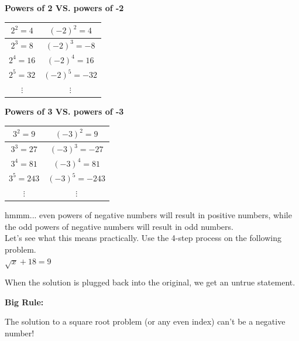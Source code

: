 \documentclass[12pt]{article}
\begin{document}
\begin{multicols}{2}

\textbf{Powers of 2 VS. powers of -2}\\

\begin{tabular}{|c|c|}

\hline

$2^2=4$ & $(-2)^2=4$\\
\hline
$2^3=8$ & $(-2)^3=-8$\\
\hline
$2^4=16$ & $(-2)^4=16$\\
\hline
$2^5=32$ & $(-2)^5=-32$\\
\hline
$\vdots$ & $\vdots$

\end{tabular}

\textbf{Powers of 3 VS. powers of -3}\\

\begin{tabular}{|c|c|}

\hline

$3^2=9$ & $(-3)^2=9$\\
\hline
$3^3=27$ & $(-3)^3=-27$\\
\hline
$3^4=81$ & $(-3)^4=81$\\
\hline
$3^5=243$ & $(-3)^5=-243$\\
\hline
$\vdots$ & $\vdots$

\end{tabular}

\end{multicols}

\vspace{1cm}

hmmm... even powers of negative numbers will result in positive numbers, while the odd powers of negative numbers will result in odd numbers. \\

Let's see what this means practically. Use the 4-step process on the following problem.\\

$\sqrt{x}+18=9$\\

\vspace{1in}

When the solution is plugged back into the original, we get an untrue statement.\\

\vspace{1cm}

\begin{large} \textbf{Big Rule:} \end{large} The solution to a square root problem (or any even index) can't be a negative number!\\
\end{document}
